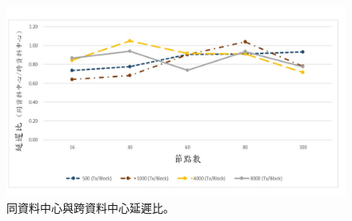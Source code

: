 \begin{figure}[t]
\centering
\includegraphics[scale=0.5]{images/66.jpg}
\caption{同資料中心與跨資料中心延遲比。}
\label{i:byz-latency}
\end{figure}
